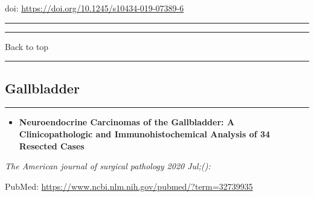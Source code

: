 \documentclass[
]{article}
\providecommand{\tightlist}{%
  \setlength{\itemsep}{0pt}\setlength{\parskip}{0pt}}
\begin{document}
doi: \url{https://doi.org/10.1245/s10434-019-07389-6}

\begin{center}\rule{0.5\linewidth}{0.5pt}\end{center}

\begin{center}\rule{0.5\linewidth}{0.5pt}\end{center}

Back to top

\begin{center}\rule{0.5\linewidth}{0.5pt}\end{center}

\pagebreak

\hypertarget{gallbladder}{%
\subsection{Gallbladder}\label{gallbladder}}

\begin{center}\rule{0.5\linewidth}{0.5pt}\end{center}

\begin{itemize}
\tightlist
\item
  \textbf{Neuroendocrine Carcinomas of the Gallbladder: A
  Clinicopathologic and Immunohistochemical Analysis of 34 Resected
  Cases}
\end{itemize}

\emph{The American journal of surgical pathology 2020 Jul;():}

PubMed: \url{https://www.ncbi.nlm.nih.gov/pubmed/?term=32739935}
\end{document}
